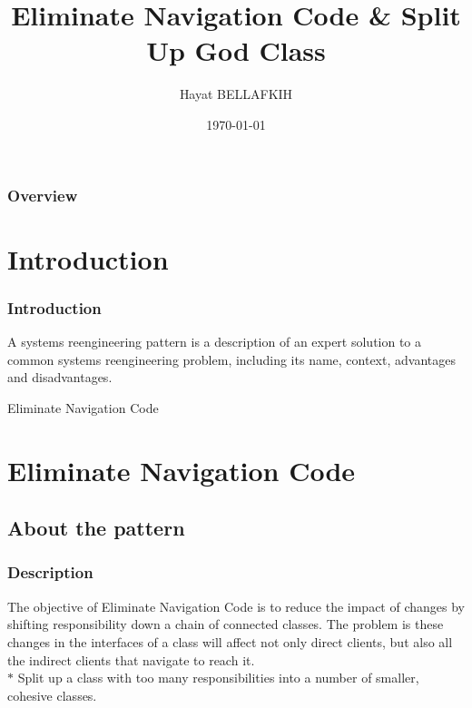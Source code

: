 \documentclass{beamer}
\title[Redistribute Responsibilities]{Eliminate Navigation Code \& Split Up God Class} %
\author{Hayat BELLAFKIH} %
\institute[UMONS] %
{
University of Mons\\ %
\medskip
\textit{hayat.BELLAFKIH@student.umons.ac.be} %
}
\date{\today} %
\begin{document}
\begin{frame}
\titlepage %
\end{frame}

\begin{frame}
\frametitle{Overview} %
\tableofcontents[hideallsubsections] %
\end{frame}


\section{Introduction} 
\begin{frame}
\frametitle{Introduction}
A systems reengineering pattern is a description of an expert solution to a common systems reengineering problem, including its name, context, advantages and disadvantages.
\end{frame}
\begin{center}
\begin{frame}
Eliminate Navigation Code
\end{frame}
\end{center}
\section{Eliminate Navigation Code}
\subsection{About the pattern}
\begin{frame}
\frametitle{Description}

The objective of Eliminate Navigation Code is to reduce the impact of changes by shifting responsibility down a chain of connected classes. The problem is these changes in the interfaces of a class will affect not only direct clients, but also all the indirect clients that navigate to reach it. \\ 
\setlength{\parskip}{10pt plus 1pt minus 1pt}
$\ast$ Split up a class with too many responsibilities into a number of smaller, cohesive classes.
\end{frame}
\end{document}
